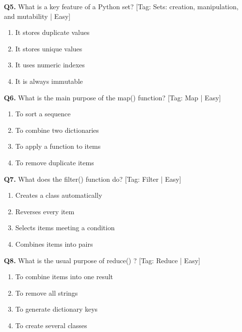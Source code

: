 \vspace{2mm}
\noindent\textbf{Q5.} What is a key feature of a Python set? \hfill [Tag: Sets: creation, manipulation, and mutability | Easy]
\begin{enumerate}[label=(\alph*),topsep=2pt,itemsep=1pt,partopsep=0pt,parsep=0pt]
    \item {It stores duplicate values}
    \item {It stores unique values}
    \item {It uses numeric indexes}
    \item {It is always immutable}
\end{enumerate}
\vspace{2mm}
\noindent\textbf{Q6.} What is the main purpose of the map() function? \hfill [Tag: Map | Easy]
\begin{enumerate}[label=(\alph*),topsep=2pt,itemsep=1pt,partopsep=0pt,parsep=0pt]
    \item {To sort a sequence}
    \item {To combine two dictionaries}
    \item {To apply a function to items}
    \item {To remove duplicate items}
\end{enumerate}
\vspace{2mm}
\noindent\textbf{Q7.} What does the filter() function do? \hfill [Tag: Filter | Easy]
\begin{enumerate}[label=(\alph*),topsep=2pt,itemsep=1pt,partopsep=0pt,parsep=0pt]
    \item {Creates a class automatically}
    \item {Reverses every item}
    \item {Selects items meeting a condition}
    \item {Combines items into pairs}
\end{enumerate}
\vspace{2mm}
\noindent\textbf{Q8.} What is the usual purpose of reduce() ? \hfill [Tag: Reduce | Easy]
\begin{enumerate}[label=(\alph*),topsep=2pt,itemsep=1pt,partopsep=0pt,parsep=0pt]
    \item {To combine items into one result}
    \item {To remove all strings}
    \item {To generate dictionary keys}
    \item {To create several classes}
\end{enumerate}
\vspace{2mm}
